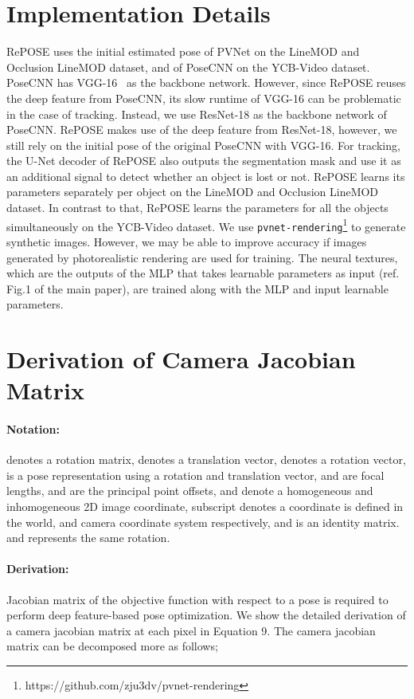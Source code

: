 \documentclass[10pt,twocolumn,letterpaper]{article}
\begin{document}
\section{Implementation Details}
RePOSE uses the initial estimated pose of PVNet on the LineMOD and Occlusion LineMOD dataset, and of PoseCNN on the YCB-Video dataset. PoseCNN has VGG-16~\cite{Simonyan15} as the backbone network. However, since RePOSE reuses the deep feature from PoseCNN, its slow runtime of VGG-16 can be problematic in the case of tracking. Instead, we use ResNet-18 as the backbone network of PoseCNN. RePOSE makes use of the deep feature from ResNet-18, however, we still rely on the initial pose of the original PoseCNN with VGG-16. For tracking, the U-Net decoder of RePOSE also outputs the segmentation mask and use it as an additional signal to detect whether an object is lost or not. RePOSE learns its parameters separately per object on the LineMOD and Occlusion LineMOD dataset. In contrast to that, RePOSE learns the parameters for all the objects simultaneously on the YCB-Video dataset. We use \texttt{pvnet-rendering}\footnote{https://github.com/zju3dv/pvnet-rendering} to generate synthetic images. However, we may be able to improve accuracy if images generated by photorealistic rendering are used for training. The neural textures, which are the outputs of the MLP that takes learnable parameters as input (ref. Fig.1 of the main paper), are trained along with the MLP and input learnable parameters.

\section{Derivation of Camera Jacobian Matrix}

\paragraph{Notation:}
 denotes a rotation matrix,  denotes a translation vector,  denotes a rotation vector,  is a pose representation using a rotation and translation vector,  and  are focal lengths,  and  are the principal point offsets,  and  denote a homogeneous and inhomogeneous 2D image coordinate, subscript  denotes a coordinate is defined in the world, and camera coordinate system respectively, and  is an  identity matrix.
 and  represents the same rotation.

\paragraph{Derivation:}
Jacobian matrix  of the objective function with respect to a pose  is required to perform deep feature-based pose optimization.
We show the detailed derivation of a camera jacobian matrix  at each pixel in Equation 9.
The camera jacobian matrix can be decomposed more as follows;
\end{document}
